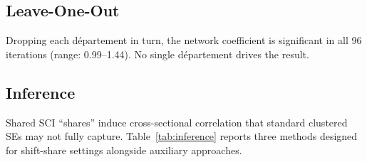 \documentclass[12pt]{article}
\newcommand{\dept}{d\'{e}partement}
\begin{document}
\subsection{Leave-One-Out}

Dropping each \dept{} in turn, the network coefficient is significant in all 96 iterations (range: 0.99--1.44). No single \dept{} drives the result.

\subsection{Inference}
\label{sec:inference}

Shared SCI ``shares'' induce cross-sectional correlation that standard clustered SEs may not fully capture. Table~\ref{tab:inference} reports three methods designed for shift-share settings alongside auxiliary approaches.
\end{document}
